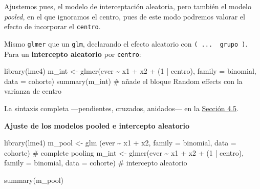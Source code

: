 \documentclass[
  letterpaper,
  DIV=11,
  numbers=noendperiod]{scrartcl}
\newenvironment{Shaded}{\begin{snugshade}}{\end{snugshade}}
\newcommand{\AttributeTok}[1]{\textcolor[rgb]{0.40,0.45,0.13}{#1}}
\newcommand{\CommentTok}[1]{\textcolor[rgb]{0.37,0.37,0.37}{#1}}
\newcommand{\DecValTok}[1]{\textcolor[rgb]{0.68,0.00,0.00}{#1}}
\newcommand{\FunctionTok}[1]{\textcolor[rgb]{0.28,0.35,0.67}{#1}}
\newcommand{\NormalTok}[1]{\textcolor[rgb]{0.00,0.23,0.31}{#1}}
\newcommand{\OtherTok}[1]{\textcolor[rgb]{0.00,0.23,0.31}{#1}}
\newcommand{\SpecialCharTok}[1]{\textcolor[rgb]{0.37,0.37,0.37}{#1}}
\begin{document}
Ajustemos pues, el modelo de interceptación aleatoria, pero también el
modelo \emph{pooled}, en el que ignoramos el centro, pues de este modo
podremos valorar el efecto de incorporar el \texttt{centro}.

\begin{tcolorbox}[enhanced jigsaw, coltitle=black, rightrule=.15mm, arc=.35mm, leftrule=.75mm, colback=white, colbacktitle=quarto-callout-tip-color!10!white, left=2mm, breakable, toptitle=1mm, toprule=.15mm, bottomtitle=1mm, titlerule=0mm, title=\textcolor{quarto-callout-tip-color}{\faLightbulb}\hspace{0.5em}{🔧 En R. Ajustar un GLMM de intercepto aleatorio}, bottomrule=.15mm, opacityback=0, opacitybacktitle=0.6, colframe=quarto-callout-tip-color-frame]

Mismo \texttt{glmer} que un \texttt{glm}, declarando el efecto aleatorio
con \texttt{(\ ...\ \textbar{}\ grupo\ )}. Para un \textbf{intercepto
aleatorio} por \texttt{centro}:

\begin{Shaded}
\begin{Highlighting}[]
\FunctionTok{library}\NormalTok{(lme4)}
\NormalTok{m\_int }\OtherTok{\textless{}{-}} \FunctionTok{glmer}\NormalTok{(ever }\SpecialCharTok{\textasciitilde{}}\NormalTok{ x1 }\SpecialCharTok{+}\NormalTok{ x2 }\SpecialCharTok{+}\NormalTok{ (}\DecValTok{1} \SpecialCharTok{|}\NormalTok{ centro), }\AttributeTok{family =}\NormalTok{ binomial, }\AttributeTok{data =}\NormalTok{ cohorte)}
\FunctionTok{summary}\NormalTok{(m\_int)        }\CommentTok{\# añade el bloque \textquotesingle{}Random effects\textquotesingle{} con la varianza de centro}
\end{Highlighting}
\end{Shaded}

La sintaxis completa ---pendientes, cruzados, anidados--- en la
\protect\hyperlink{sec-u14-extensiones}{Sección 4.5}.

\end{tcolorbox}

\textbf{Ajuste de los modelos pooled e intercepto aleatorio}

\begin{Shaded}
\begin{Highlighting}[]
\FunctionTok{library}\NormalTok{(lme4)}
\NormalTok{m\_pool }\OtherTok{\textless{}{-}} \FunctionTok{glm}\NormalTok{  (ever }\SpecialCharTok{\textasciitilde{}}\NormalTok{ x1 }\SpecialCharTok{+}\NormalTok{ x2,                }\AttributeTok{family =}\NormalTok{ binomial, }\AttributeTok{data =}\NormalTok{ cohorte)  }\CommentTok{\# complete pooling}
\NormalTok{m\_int  }\OtherTok{\textless{}{-}} \FunctionTok{glmer}\NormalTok{(ever }\SpecialCharTok{\textasciitilde{}}\NormalTok{ x1 }\SpecialCharTok{+}\NormalTok{ x2 }\SpecialCharTok{+}\NormalTok{ (}\DecValTok{1} \SpecialCharTok{|}\NormalTok{ centro),  }\AttributeTok{family =}\NormalTok{ binomial, }\AttributeTok{data =}\NormalTok{ cohorte)  }\CommentTok{\# intercepto aleatorio}

\FunctionTok{summary}\NormalTok{(m\_pool)}
\end{Highlighting}
\end{Shaded}
\end{document}
